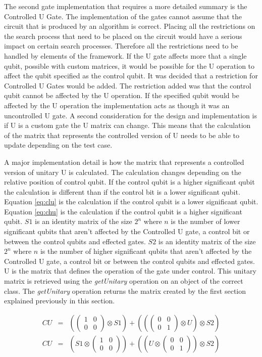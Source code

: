 The second gate implementation that requires a more detailed summary is the Controlled U Gate.
The implementation of the gates cannot assume that the circuit that is produced by an algorithm is correct.
Placing all the restrictions on the search process that need to be placed on the circuit would have a serious impact on certain search processes.
Therefore all the restrictions need to be handled by elements of the framework.
If the U gate affects more that a single qubit, possible with custom matrices, it would be possible for the U operation to affect the qubit specified as the control qubit.
It was decided that a restriction for Controlled U Gates would be added.
The restriction added was that the control qubit cannot be affected by the U operation.
If the specified qubit would be affected by the U operation the implementation acts as though it was an uncontrolled U gate.
A second consideration for the design and implementation is if U is a custom gate the U matrix can change.
This means that the calculation of the matrix that represents the controlled version of U needs to be able to update depending on the test case.

A major implementation detail is how the matrix that represents a controlled version of unitary U is calculated.
The calculation changes depending on the relative position of control qubit.
If the control qubit is a higher significant qubit the calculation is different than if the control bit is a lower significant qubit.
Equation \ref{eq:clu} is the calculation if the control qubit is a lower significant qubit.
Equation \ref{eq:chu} is the calculation if the control qubit is a higher significant qubit.
$S1$ is an identity matrix of the size $2^n$ where $n$ is the number of lower significant qubits that aren't affected by the Controlled U gate, a control bit or between the control qubits and effected gates.
$S2$ is an identity matrix of the size $2^n$ where $n$ is the number of higher significant qubits that aren't affected by the Controlled U gate, a control bit or between the control qubits and effected gates.
U is the matrix that defines the operation of the gate under control.
This unitary matrix is retrieved using the \emph{getUnitary} operation on an object of the correct class.
The \emph{getUnitary} operation returns the matrix created by the first section explained previously in this section.

\begin{eqnarray}
\label{eq:clu}
 CU&=& (\begin{pmatrix}1&0\\0&0\end{pmatrix}\otimes S1)+((\begin{pmatrix}0&0\\0&1\end{pmatrix}\otimes U) \otimes S2) \\
\label{eq:chu}
 CU&=& ( S1 \otimes \begin{pmatrix}1&0\\0&0\end{pmatrix})+((U \otimes \begin{pmatrix}0&0\\0&1\end{pmatrix}) \otimes S2)
\end{eqnarray}

